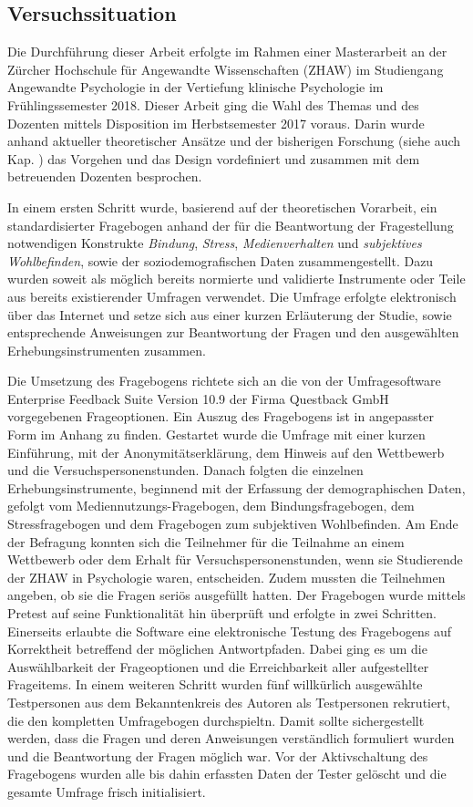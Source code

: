 \subsection{Versuchssituation}\label{sec:Versuchssituation}
Die Durchführung dieser Arbeit erfolgte im Rahmen einer Masterarbeit an der Zürcher Hochschule für Angewandte Wissenschaften (ZHAW) im Studiengang Angewandte Psychologie in der Vertiefung klinische Psychologie im Frühlingssemester 2018. Dieser Arbeit ging die Wahl des Themas und des Dozenten mittels Disposition im Herbstsemester 2017 voraus. Darin wurde anhand aktueller theoretischer Ansätze und der bisherigen Forschung (siehe auch Kap. ) das Vorgehen und das Design vordefiniert und zusammen mit dem betreuenden Dozenten besprochen. 

In einem ersten Schritt wurde, basierend auf der theoretischen Vorarbeit, ein standardisierter Fragebogen anhand der für die Beantwortung der Fragestellung notwendigen Konstrukte \textit{Bindung}, \textit{Stress}, \textit{Medienverhalten} und \textit{subjektives Wohlbefinden}, sowie der soziodemografischen Daten zusammengestellt. Dazu wurden soweit als möglich bereits normierte und validierte Instrumente oder Teile aus bereits existierender Umfragen verwendet. Die Umfrage erfolgte elektronisch über das Internet und setze sich aus einer kurzen Erläuterung der Studie, sowie entsprechende Anweisungen zur Beantwortung der Fragen und den ausgewählten Erhebungsinstrumenten zusammen. 

Die Umsetzung des Fragebogens richtete sich an die von der Umfragesoftware Enterprise Feedback Suite Version 10.9 der Firma Questback GmbH vorgegebenen Frageoptionen. Ein Auszug des Fragebogens ist in angepasster Form im Anhang  zu finden. Gestartet wurde die Umfrage mit einer kurzen Einführung, mit der Anonymitätserklärung, dem Hinweis auf den Wettbewerb und die Versuchspersonenstunden. Danach folgten die einzelnen Erhebungsinstrumente, beginnend mit der Erfassung der demographischen Daten, gefolgt vom Mediennutzungs-Fragebogen, dem Bindungsfragebogen, dem Stressfragebogen und dem Fragebogen zum subjektiven Wohlbefinden. Am Ende der Befragung konnten sich die Teilnehmer für die Teilnahme an einem Wettbewerb oder dem Erhalt für Versuchspersonenstunden, wenn sie Studierende der ZHAW in Psychologie waren, entscheiden. Zudem mussten die Teilnehmen angeben, ob sie die Fragen seriös ausgefüllt hatten. Der Fragebogen wurde mittels Pretest auf seine Funktionalität hin überprüft und erfolgte in zwei Schritten. Einerseits erlaubte die Software eine elektronische Testung des Fragebogens auf Korrektheit betreffend der möglichen Antwortpfaden. Dabei ging es um die Auswählbarkeit der Frageoptionen und die Erreichbarkeit aller aufgestellter Frageitems. In einem weiteren Schritt wurden fünf willkürlich ausgewählte Testpersonen aus dem Bekanntenkreis des Autoren als Testpersonen rekrutiert, die den kompletten Umfragebogen durchspieltn. Damit sollte sichergestellt werden, dass die Fragen und deren Anweisungen verständlich formuliert wurden und die Beantwortung der Fragen möglich war. Vor der Aktivschaltung des Fragebogens wurden alle bis dahin erfassten Daten der Tester gelöscht und die gesamte Umfrage frisch initialisiert.

